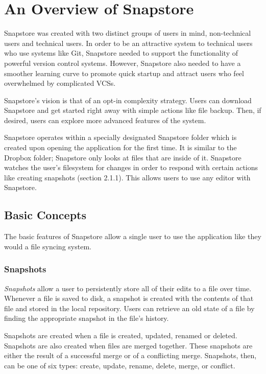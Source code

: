 \chapter{An Overview of Snapstore}

Snapstore was created with two distinct groups of users in mind, non-technical users and technical users. In order to be an attractive system to technical users who use systems like Git, Snapstore needed to support the functionality of powerful version control systems. However, Snapstore also needed to have a smoother learning curve to promote quick startup and attract users who feel overwhelmed by complicated VCSs. 

Snapstore's vision is that of an opt-in complexity strategy. Users can download Snapstore and get started right away with simple actions like file backup. Then, if desired, users can explore more advanced features of the system.

Snapstore operates within a specially designated Snapstore folder which is created upon opening the application for the first time. It is similar to the Dropbox folder; Snapstore only looks at files that are inside of it. Snapstore watches the user's filesystem for changes in order to respond with certain actions like creating snapshots (section 2.1.1). This allows users to use any editor with Snapstore.

\section{Basic Concepts}

The basic features of Snapstore allow a single user to use the application like they would a file syncing system.

\subsection{Snapshots}

\textit{Snapshots} allow a user to persistently store all of their edits to a file over time. Whenever a file is saved to disk, a snapshot is created with the contents of that file and stored in the local repository. Users can retrieve an old state of a file by finding the appropriate snapshot in the file's history.

Snapshots are created when a file is created, updated, renamed or deleted. Snapshots are also created when files are merged together. These snapshots are either the result of a successful merge or of a conflicting merge. Snapshots, then, can be one of six types: create, update, rename, delete, merge, or conflict.

